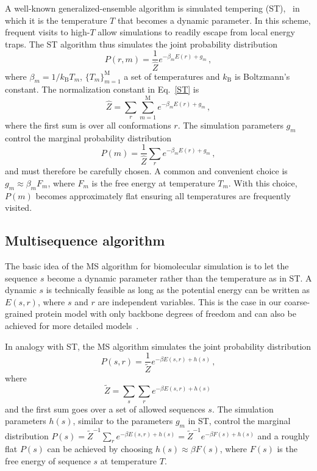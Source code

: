 \documentclass[
aip,
rsi,%
amsmath,amssymb,
reprint,%
]{revtex4-1}
\newcommand	 {\sbar}	{{s}}
\newcommand	 {\rbar}	{{r}}
\begin{document}
A well-known generalized-ensemble algorithm is simulated tempering (ST),~\cite{Marinari1992,Lyubartsev1992} in which it is the temperature $T$ that becomes a dynamic parameter. In this scheme, frequent visits to high-$T$ allow simulations to readily escape from local energy traps. The ST algorithm thus simulates the joint probability distribution 
\begin{equation}
P(\rbar,m) =\dfrac{1}{\hat{Z}} e^{-\beta_m E(\rbar) + g_m}\,,
\label{ST}
\end{equation}
where  $\beta_m=1/k_\mathrm{B} T_m$, $\{T_m\}_{m=1}^\mathrm{M}$ a set of temperatures and $k_\mathrm{B}$ is Boltzmann's constant. The normalization constant in Eq.~\ref{ST} is  
\begin{equation}
\hat{Z} = \sum_r \sum_{m=1}^{\mathrm{M}}e^{-\beta_m E(\rbar) + g_m}\,,
\end{equation}
where the first sum is over all conformations $\rbar$. The simulation parameters $g_m$ control the marginal probability distribution
\begin{equation}
P(m) = \frac{1}{\hat{Z}}\sum_r e^{-\beta_m E(\rbar) + g_m} \,,
\end{equation}
and must therefore be carefully chosen. A common and convenient choice is $g_m\approx \beta_m F_m$, where $F_m$ is the free energy at temperature $T_m$. With this choice, $P(m)$ becomes approximately flat ensuring all temperatures are frequently visited. 

\subsection{Multisequence algorithm}
\noindent 
The basic idea of the MS algorithm for biomolecular simulation is to let the sequence $\sbar$ become a dynamic parameter rather than the temperature as in ST. A dynamic $\sbar$ is technically feasible as long as the potential energy can be written as $E(\sbar,\rbar)$, where $\sbar$ and $\rbar$ are independent variables. This is the case in our coarse-grained protein model with only backbone degrees of freedom and can also be achieved for more detailed  models~\cite{Bhattacherjee2013,Wallin2017}. 

In analogy with ST, the MS algorithm simulates the joint probability distribution
\begin{equation}
P(\sbar,\rbar) =\dfrac{1}{\tilde{Z}}e^{-\beta E(\sbar,\rbar) + h(\sbar)}\,, 
\label{MS}
\end{equation}
where  
\begin{equation}
\tilde{Z} = \sum_{\sbar}\sum_{\rbar} e^{-\beta E(\sbar,\rbar)+ h(\sbar)}\,
\end{equation}
and the first sum goes over a set of allowed sequences $\sbar$. The simulation parameters $h(\sbar)$, similar to the parameters $g_m$ in ST, control the marginal distribution $P(\sbar)=\tilde{Z}^{-1}\sum_{\rbar} e^{-\beta E(\sbar,\rbar)+ h(\sbar)} = \tilde{Z}^{-1}e^{-\beta F(\sbar)+ h(\sbar)}$ and a roughly flat $P(\sbar)$ can be achieved by choosing $h(\sbar) \approx \beta F(\sbar)$, where $F(\sbar)$ is the free energy of sequence $\sbar$ at temperature $T$. 
\end{document}
